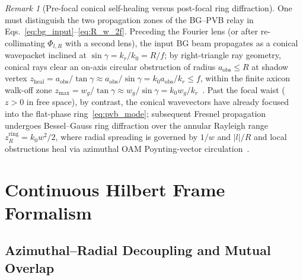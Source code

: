 \documentclass[aps,pra,reprint,nofootinbib,floatfix,longbibliography]{revtex4-2}
\theoremstyle{remark}
\newtheorem{remark}{Remark}
\newcommand{\abs}[1]{\lvert #1 \rvert}
\begin{document}
\begin{remark}[Pre-focal conical self-healing versus post-focal ring diffraction]
\label{rem:propagation}
One must distinguish the two propagation zones of the BG--PVB relay in Eqs.~\eqref{eq:bg_input}--\eqref{eq:R_w_2f}. Preceding the Fourier lens (or after re-collimating $\Phi_{l,R}$ with a second lens), the input BG beam propagates as a conical wavepacket inclined at $\sin\gamma = k_r/k_0 = R/f$; by right-triangle ray geometry, conical rays clear an on-axis circular obstruction of radius $a_{\mathrm{obs}} \le R$ at shadow vertex $z_{\mathrm{heal}} = a_{\mathrm{obs}}/\tan\gamma \approx a_{\mathrm{obs}}/\sin\gamma = k_0 a_{\mathrm{obs}}/k_r \le f$, within the finite axicon walk-off zone $z_{\max} = w_g/\tan\gamma \approx w_g/\sin\gamma = k_0 w_g/k_r$~\cite{Gori1987}. Past the focal waist ($z > 0$ in free space), by contrast, the conical wavevectors have already focused into the flat-phase ring~\eqref{eq:pvb_mode}; subsequent Fresnel propagation undergoes Bessel--Gauss ring diffraction over the annular Rayleigh range $z_R^{\mathrm{ring}} = k_0 w^2/2$, where radial spreading is governed by $1/w$ and $\abs{l}/R$ and local obstructions heal via azimuthal OAM Poynting-vector circulation~\cite{Reddy2016}.
\end{remark}

\section{Continuous Hilbert Frame Formalism}
\label{sec:frame_theory}

\subsection{Azimuthal--Radial Decoupling and Mutual Overlap}
\label{subsec:decoupling}
\end{document}
